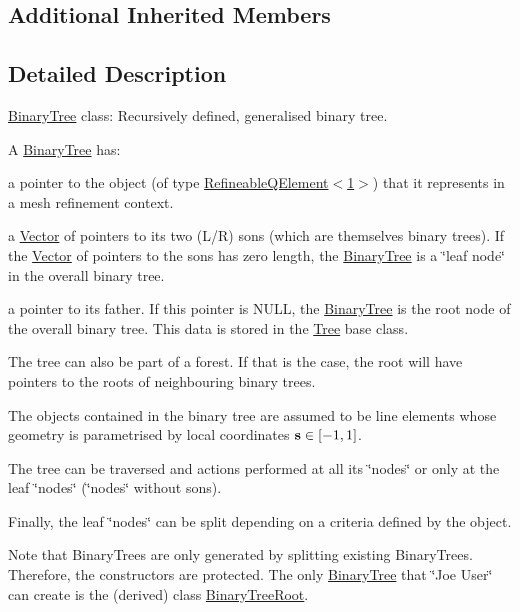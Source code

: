 \subsection*{Additional Inherited Members}


\subsection{Detailed Description}
\hyperlink{classoomph_1_1BinaryTree}{Binary\+Tree} class\+: Recursively defined, generalised binary tree.

A \hyperlink{classoomph_1_1BinaryTree}{Binary\+Tree} has\+:
\begin{DoxyItemize}
\item a pointer to the object (of type \hyperlink{classoomph_1_1RefineableQElement_3_011_01_4}{Refineable\+Q\+Element$<$1$>$}) that it represents in a mesh refinement context.
\item a \hyperlink{classoomph_1_1Vector}{Vector} of pointers to its two (L/R) sons (which are themselves binary trees). If the \hyperlink{classoomph_1_1Vector}{Vector} of pointers to the sons has zero length, the \hyperlink{classoomph_1_1BinaryTree}{Binary\+Tree} is a \char`\"{}leaf node\char`\"{} in the overall binary tree.
\item a pointer to its father. If this pointer is N\+U\+LL, the \hyperlink{classoomph_1_1BinaryTree}{Binary\+Tree} is the root node of the overall binary tree. This data is stored in the \hyperlink{classoomph_1_1Tree}{Tree} base class.
\end{DoxyItemize}

The tree can also be part of a forest. If that is the case, the root will have pointers to the roots of neighbouring binary trees.

The objects contained in the binary tree are assumed to be line elements whose geometry is parametrised by local coordinates $ {\bf s} \in [-1,1] $.

The tree can be traversed and actions performed at all its \char`\"{}nodes\char`\"{} or only at the leaf \char`\"{}nodes\char`\"{} (\char`\"{}nodes\char`\"{} without sons).

Finally, the leaf \char`\"{}nodes\char`\"{} can be split depending on a criteria defined by the object.

Note that Binary\+Trees are only generated by splitting existing Binary\+Trees. Therefore, the constructors are protected. The only \hyperlink{classoomph_1_1BinaryTree}{Binary\+Tree} that \char`\"{}\+Joe User\char`\"{} can create is the (derived) class \hyperlink{classoomph_1_1BinaryTreeRoot}{Binary\+Tree\+Root}. 

